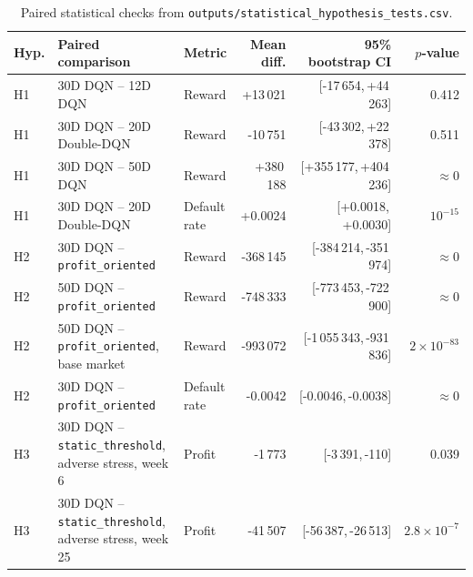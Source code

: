 \documentclass[12pt,a4paper]{article}
\begin{document}
\begin{table}[H]
    \centering
    \scriptsize
    \begin{tabular}{p{}p{}p{}r r r}
        \toprule
        Hyp. & Paired comparison                                              & Metric       & Mean diff. & 95\% bootstrap CI          & $p$-value              \\
        \midrule
        H1   & 30D DQN -- 12D DQN                                             & Reward       & +13\,021   & [-17\,654,\,+44\,263]      & 0.412                  \\
        H1   & 30D DQN -- 20D Double-DQN                                      & Reward       & -10\,751   & [-43\,302,\,+22\,378]      & 0.511                  \\
        H1   & 30D DQN -- 50D DQN                                             & Reward       & +380\,188  & [+355\,177,\,+404\,236]    & $\approx 0$            \\
        H1   & 30D DQN -- 20D Double-DQN                                      & Default rate & +0.0024    & [+0.0018,\,+0.0030]        & $10^{-15}$             \\
        H2   & 30D DQN -- \texttt{profit\_oriented}                           & Reward       & -368\,145  & [-384\,214,\,-351\,974]    & $\approx 0$            \\
        H2   & 50D DQN -- \texttt{profit\_oriented}                           & Reward       & -748\,333  & [-773\,453,\,-722\,900]    & $\approx 0$            \\
        H2   & 50D DQN -- \texttt{profit\_oriented}, base market              & Reward       & -993\,072  & [-1\,055\,343,\,-931\,836] & $2\!\times\!10^{-83}$  \\
        H2   & 30D DQN -- \texttt{profit\_oriented}                           & Default rate & -0.0042    & [-0.0046,\,-0.0038]        & $\approx 0$            \\
        H3   & 30D DQN -- \texttt{static\_threshold}, adverse stress, week 6  & Profit       & -1\,773    & [-3\,391,\,-110]           & 0.039                  \\
        H3   & 30D DQN -- \texttt{static\_threshold}, adverse stress, week 25 & Profit       & -41\,507   & [-56\,387,\,-26\,513]      & $2.8\!\times\!10^{-7}$ \\
        \bottomrule
    \end{tabular}
    \caption{Paired statistical checks from \texttt{outputs/statistical\_hypothesis\_tests.csv}.}
    \label{tab:en-stat-tests}
\end{table}
\end{document}
